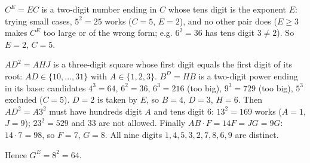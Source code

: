$C^E=EC$ is a two-digit number ending in $C$ whose tens digit is the exponent $E$: trying small cases, $5^2=25$ works ($C=5$, $E=2$), and no other pair does ($E\ge3$ makes $C^E$ too large or of the wrong form; e.g. $6^2=36$ has tens digit $3\ne2$). So $E=2$, $C=5$.

$AD^2=AHJ$ is a three-digit square whose first digit equals the first digit of its root: $AD\in\{10,\dots,31\}$ with $A\in\{1,2,3\}$. $B^D=HB$ is a two-digit power ending in its base: candidates $4^3=64$, $6^2=36$, $6^3=216$ (too big), $9^3=729$ (too big), $5^3$ excluded ($C=5$). $D=2$ is taken by $E$, so $B=4$, $D=3$, $H=6$. Then $AD^2=A3^2$ must have hundreds digit $A$ and tens digit $6$: $13^2=169$ works ($A=1$, $J=9$); $23^2=529$ and $33$ are not allowed. Finally $AB\cdot F=14F=JG=9G$: $14\cdot7=98$, so $F=7$, $G=8$. All nine digits $1,4,5,3,2,7,8,6,9$ are distinct.

Hence $G^E=8^2=\boxed{64}$.
